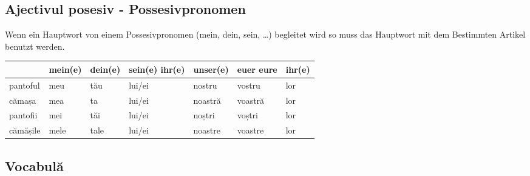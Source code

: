 \documentclass[11pt, oneside]{article}
\begin{document}
\subsection{Ajectivul posesiv - Possesivpronomen}
Wenn ein Hauptwort von einem Possesivpronomen (mein, dein, sein, \dots) begleitet wird 
so muss das Hauptwort mit dem Bestimmten Artikel benutzt werden.
%
\begin{center}
  \begin{tabular}{ | C{1.7cm}| C{1.7cm} | C{1.7cm} | C{1.7cm} | C{1.7cm} | C{1.7cm} | C{1.7cm} |}
    \hline
              & mein(e) & dein(e) & sein(e) ihr(e) & unser(e) & euer eure & ihr(e)\\
    \hline
    pantoful  & meu & tău & lui/ei & nostru & vostru & lor\\
    \hline
    cămașa & mea & ta & lui/ei & noastră & voastră & lor\\
    \hline
    pantofii & mei & tăi & lui/ei & noștri & voștri & lor\\
    \hline
    cămășile & mele & tale & lui/ei & noastre & voastre & lor\\
    \hline
  \end{tabular}
\end{center}




\subsection{Vocabulă}
\end{document}
